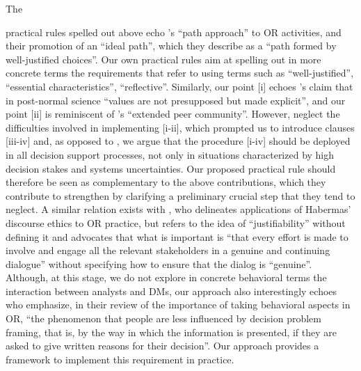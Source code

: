 \documentclass[preprint, french, english, 11pt, authoryear]{elsarticle}%
\begin{document}
The \begin{changebar}practical rules spelled out above echo \citet{lahtinen_why_2017}'s ``path approach'' to \ac{OR} activities, and their promotion of an ``ideal path'', which they describe as a ``path formed by well-justified choices''.
Our own practical rules aim at spelling out in more concrete terms the requirements that \citet{lahtinen_why_2017} refer to using terms such as ``well-justified'', ``essential characteristics'', ``reflective''.
Similarly, our point [i] echoes \citet{funtowicz_science_1993}'s claim that in post-normal science ``values are not presupposed but made explicit'', and our point [ii] is reminiscent of \citet{funtowicz_science_1993}'s ``extended peer community''.
However, \citet{funtowicz_science_1993} neglect the difficulties involved in implementing [i-ii], which prompted us to introduce clauses [iii-iv] and, as opposed to \citet{funtowicz_science_1993}, we argue that the procedure [i-iv] should be deployed in all decision support processes, not only in situations characterized by high decision stakes and systems uncertainties.
Our proposed practical rule should therefore be seen as complementary to the above contributions, which they contribute to strengthen by clarifying a preliminary crucial step that they tend to neglect.
A similar relation exists with \citet{mingers_ethics_2011}, who delineates applications of Habermas' discourse ethics to \ac{OR} practice, but refers to the idea of ``justifiability'' without defining it and advocates that what is important is ``that every effort is made to involve and engage all the relevant stakeholders in a genuine and continuing
dialogue'' without specifying how to ensure that the dialog is ``genuine''.
Although, at this stage, we do not explore in concrete behavioral terms the interaction between analysts and \acp{DM}, 
our approach also interestingly echoes \citet{hamalainen_importance_2013} who emphasize, in their review of the importance of taking behavioral aspects in \ac{OR}, 
``the phenomenon that people are less influenced by decision problem framing, that is, by the way in which the information is presented, if they are asked to give written reasons for their decision''.
Our approach provides a framework to implement this requirement in practice.\end{changebar}
\end{document}
